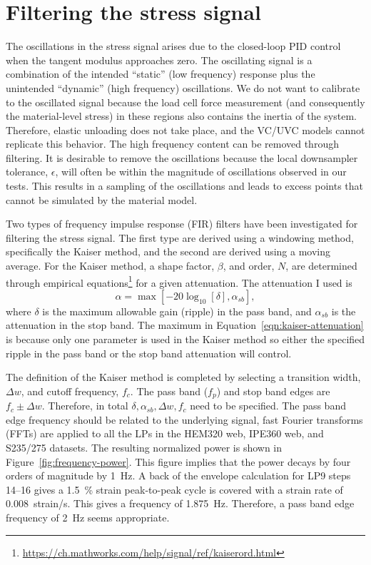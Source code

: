 \documentclass[a4paper,11pt]{article}
\begin{document}



\appendix

\section{Filtering the stress signal}

The oscillations in the stress signal arises due to the closed-loop PID control when the tangent modulus approaches zero.
The oscillating signal is a combination of the intended ``static'' (low frequency) response plus the unintended ``dynamic'' (high frequency) oscillations.
We do not want to calibrate to the oscillated signal because the load cell force measurement (and consequently the material-level stress) in these regions also contains the inertia of the system.
Therefore, elastic unloading does not take place, and the VC/UVC models cannot replicate this behavior.
The high frequency content can be removed through filtering.
It is desirable to remove the oscillations because the local downsampler tolerance, $\epsilon$, will often be within the magnitude of oscillations observed in our tests.
This results in a sampling of the oscillations and leads to excess points that cannot be simulated by the material model.

Two types of frequency impulse response (FIR) filters have been investigated for filtering the stress signal.
The first type are derived using a windowing method, specifically the Kaiser method, and the second are derived using a moving average.
For the Kaiser method, a shape factor, $\beta$, and order, $N$, are determined through empirical equations\footnote{\url{https://ch.mathworks.com/help/signal/ref/kaiserord.html}} for a given attenuation.
The attenuation I used is
\begin{equation}
    \label{eqn:kaiser-attenuation}
    \alpha = \max \left[ -20 \log_{10}[\delta] , \alpha_{sb} \right],
\end{equation}
where $\delta$ is the maximum allowable gain (ripple) in the pass band, and $\alpha_{sb}$ is the attenuation in the stop band.
The maximum in Equation~\ref{eqn:kaiser-attenuation} is because only one parameter is used in the Kaiser method so either the specified ripple in the pass band or the stop band attenuation will control.

The definition of the Kaiser method is completed by selecting a transition width, $\Delta w$, and cutoff frequency, $f_c$.
The pass band ($f_p$) and stop band edges are $f_c \pm \Delta w$.
Therefore, in total $\delta, \alpha_{sb}, \Delta w, f_c$ need to be specified.
The pass band edge frequency should be related to the underlying signal, fast Fourier transforms (FFTs) are applied to all the LPs in the HEM320 web, IPE360 web, and S235/275 datasets.
The resulting normalized power is shown in Figure~\ref{fig:frequency-power}.
This figure implies that the power decays by four orders of magnitude by 1~Hz.
A back of the envelope calculation for LP9 steps 14--16 gives a 1.5~\% strain peak-to-peak cycle is covered with a strain rate of 0.008~strain/s.
This gives a frequency of 1.875~Hz.
Therefore, a pass band edge frequency of 2~Hz seems appropriate.
\end{document}
